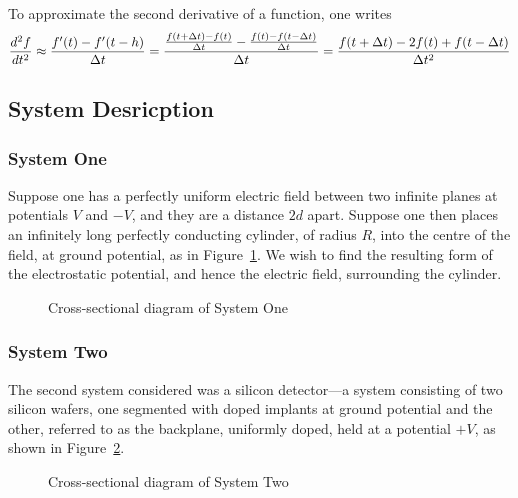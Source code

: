 \documentclass[12pt, a4paper]{article}
\newcommand{\be}{\begin{equation}}
\newcommand{\ee}{\end{equation}}
\begin{document}
To approximate the second derivative of a function, one writes
%
\be
\frac{d^2 f}{dt^2} \approx \frac{f'(t) - f'(t-h)}{\Delta t} \\
= \frac{\frac{f(t +\Delta t) - f(t)}{\Delta t} - \frac{f(t) - f(t -\Delta t)}{\Delta t}}{\Delta t} \\
= \frac{f(t +\Delta t) - 2f(t) + f(t-\Delta t)}{\Delta t ^2}
\ee

\subsection{System Desricption}
\subsubsection{System One}

Suppose one has a perfectly uniform electric field between two infinite planes
at potentials $V$ and $-V$, and they are a distance $2d$ apart. Suppose one then
places an infinitely long perfectly conducting cylinder, of radius $R$, into the centre
of the field, at ground potential, as in Figure~\ref{fig:sys one}. We wish to find the
resulting form of the electrostatic potential, and hence the electric field, surrounding
the cylinder.

\begin{figure}[h!]
\begin{center}
\end{center}
\caption{Cross-sectional diagram of System One}
\label{fig:sys one}
\end{figure}

\subsubsection{System Two}

The second system considered was a silicon detector---a system consisting of two
silicon wafers, one segmented with doped implants at ground potential and the other,
referred to as the backplane, uniformly doped, held at a potential $+V$, as shown
in Figure~\ref{fig:sys two}.

\begin{figure}[h!]
\begin{center}
\end{center}
\caption{Cross-sectional diagram of System Two}
\label{fig:sys two}
\end{figure}
\end{document}
